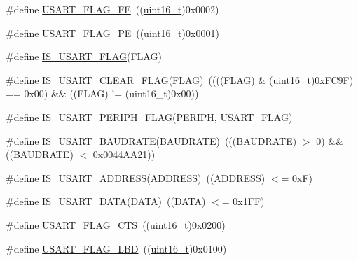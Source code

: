 \begin{DoxyCompactItemize}
\item 
\#define \hyperlink{group___u_s_a_r_t___flags_ga3551a32bac49a2ec040e5fdafcc9c4bd}{U\+S\+A\+R\+T\+\_\+\+F\+L\+A\+G\+\_\+\+FE}~((\hyperlink{_p_e___types_8h_a1f1825b69244eb3ad2c7165ddc99c956}{uint16\+\_\+t})0x0002)
\item 
\#define \hyperlink{group___u_s_a_r_t___flags_ga5e87fde5704f27c75df25395e23404ad}{U\+S\+A\+R\+T\+\_\+\+F\+L\+A\+G\+\_\+\+PE}~((\hyperlink{_p_e___types_8h_a1f1825b69244eb3ad2c7165ddc99c956}{uint16\+\_\+t})0x0001)
\item 
\#define \hyperlink{group___u_s_a_r_t___flags_ga3e20747ce7c97a36718933c0cb3dac29}{I\+S\+\_\+\+U\+S\+A\+R\+T\+\_\+\+F\+L\+AG}(F\+L\+AG)
\item 
\#define \hyperlink{group___u_s_a_r_t___flags_gadc905fdce8defba31c00c95554a26bc3}{I\+S\+\_\+\+U\+S\+A\+R\+T\+\_\+\+C\+L\+E\+A\+R\+\_\+\+F\+L\+AG}(F\+L\+AG)~((((F\+L\+AG) \& (\hyperlink{_p_e___types_8h_a1f1825b69244eb3ad2c7165ddc99c956}{uint16\+\_\+t})0x\+F\+C9\+F) == 0x00) \&\& ((\+F\+L\+A\+G) != (uint16\+\_\+t)0x00))
\item 
\#define \hyperlink{group___u_s_a_r_t___flags_gad8395894e77b07a0713756b355aa22e5}{I\+S\+\_\+\+U\+S\+A\+R\+T\+\_\+\+P\+E\+R\+I\+P\+H\+\_\+\+F\+L\+AG}(P\+E\+R\+I\+PH,  U\+S\+A\+R\+T\+\_\+\+F\+L\+AG)
\item 
\#define \hyperlink{group___u_s_a_r_t___flags_ga9dc365e0a1e01031a8e0757a34b9d420}{I\+S\+\_\+\+U\+S\+A\+R\+T\+\_\+\+B\+A\+U\+D\+R\+A\+TE}(B\+A\+U\+D\+R\+A\+TE)~(((B\+A\+U\+D\+R\+A\+TE) $>$ 0) \&\& ((B\+A\+U\+D\+R\+A\+TE) $<$ 0x0044\+A\+A21))
\item 
\#define \hyperlink{group___u_s_a_r_t___flags_ga194e771c3324f9e130b2887c701460a7}{I\+S\+\_\+\+U\+S\+A\+R\+T\+\_\+\+A\+D\+D\+R\+E\+SS}(A\+D\+D\+R\+E\+SS)~((A\+D\+D\+R\+E\+SS) $<$= 0x\+F)
\item 
\#define \hyperlink{group___u_s_a_r_t___flags_gafd6307e41818e076d31f3c24cb5ba135}{I\+S\+\_\+\+U\+S\+A\+R\+T\+\_\+\+D\+A\+TA}(D\+A\+TA)~((D\+A\+TA) $<$= 0x1\+F\+F)
\item 
\#define \hyperlink{group___u_s_a_r_t___flags_ga94b7272319cca88a65075d5cb6048441}{U\+S\+A\+R\+T\+\_\+\+F\+L\+A\+G\+\_\+\+C\+TS}~((\hyperlink{_p_e___types_8h_a1f1825b69244eb3ad2c7165ddc99c956}{uint16\+\_\+t})0x0200)
\item 
\#define \hyperlink{group___u_s_a_r_t___flags_ga27be6517de20ce14711f71dcd5a7b91f}{U\+S\+A\+R\+T\+\_\+\+F\+L\+A\+G\+\_\+\+L\+BD}~((\hyperlink{_p_e___types_8h_a1f1825b69244eb3ad2c7165ddc99c956}{uint16\+\_\+t})0x0100)
\item 

\end{DoxyCompactItemize}
